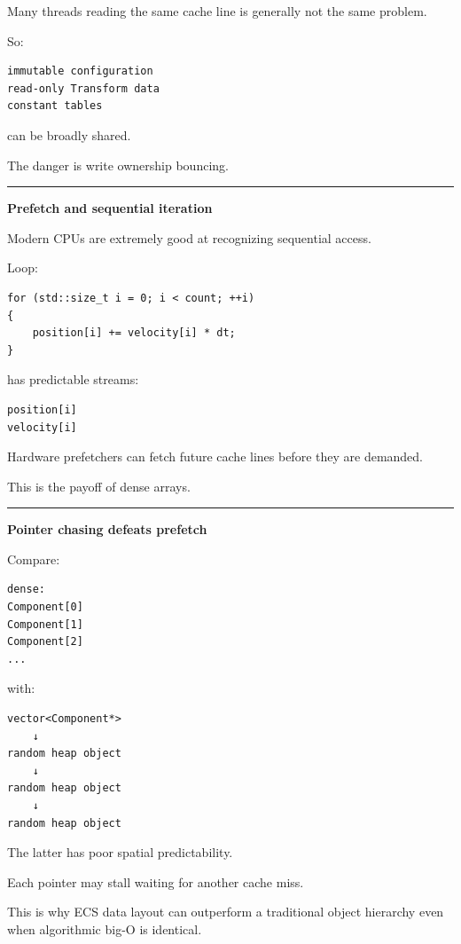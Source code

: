 Many threads reading the same cache line is generally not the same problem.

So:

\begin{verbatim}
immutable configuration
read-only Transform data
constant tables
\end{verbatim}

can be broadly shared.

The danger is write ownership bouncing.

\begin{center}\rule{0.5\linewidth}{0.5pt}\end{center}

\textbf{Prefetch and sequential iteration}

Modern CPUs are extremely good at recognizing sequential access.

Loop:

\begin{verbatim}
for (std::size_t i = 0; i < count; ++i)
{
    position[i] += velocity[i] * dt;
}
\end{verbatim}

has predictable streams:

\begin{verbatim}
position[i]
velocity[i]
\end{verbatim}

Hardware prefetchers can fetch future cache lines before they are demanded.

This is the payoff of dense arrays.

\begin{center}\rule{0.5\linewidth}{0.5pt}\end{center}

\textbf{Pointer chasing defeats prefetch}

Compare:

\begin{verbatim}
dense:
Component[0]
Component[1]
Component[2]
...
\end{verbatim}

with:

\begin{verbatim}
vector<Component*>
    ↓
random heap object
    ↓
random heap object
    ↓
random heap object
\end{verbatim}

The latter has poor spatial predictability.

Each pointer may stall waiting for another cache miss.

This is why ECS data layout can outperform a traditional object hierarchy even when algorithmic big-O is identical.


